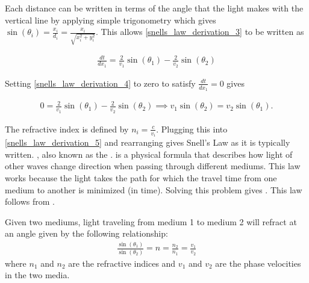 Each distance can be written in terms of the angle that the light makes with the vertical line by applying simple trigonometry which gives $\sin(\theta_i)=\frac{x_i}{d_i}=\frac{x_i}{\sqrt{x_i^2+y_i^2}}$. This allows \ref{snells_law_derivation_3} to be written as

\begin{align}
\frac{dt}{dx_1} = \frac{2}{v_1}\sin(\theta_1) - \frac{2}{v_2}\sin(\theta_2) \label{snells_law_derivation_4}
\end{align}

Setting \ref{snells_law_derivation_4} to zero to satisfy $\frac{dt}{dx_1}=0$ gives

\begin{align}
0 = \frac{2}{v_1}\sin(\theta_1) - \frac{2}{v_2}\sin(\theta_2) \implies v_1\sin(\theta_2) = v_2\sin(\theta_1) \label{snells_law_derivation_5}.
\end{align}

The refractive index is defined by $n_i = \frac{c}{v_i}$. Plugging this into \ref{snells_law_derivation_5} and rearranging gives Snell's Law as it is typically written. , also known as the . is a physical formula that describes how light of other waves change direction when passing through different mediums. This law works because the light takes the path for which the travel time from one medium to another is minimized (in time). Solving this problem gives . This law follows from .

\begin{fancybox}{1}
    Given two mediums, light traveling from medium 1 to medium 2 will refract at an angle given by the following relationship:
    \begin{align}
        \frac{\sin(\theta_1)}{\sin(\theta_2)} = n = \frac{n_2}{n_1} = \frac{v_1}{v_2} \label{Snell's Law Eqn}
    \end{align}
    where $n_1$ and $n_2$ are the refractive indices and $v_1$ and $v_2$ are the phase velocities in the two media.
\end{fancybox}

